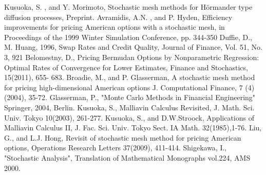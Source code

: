 \documentclass[12pt]{article}
\begin{document}
\begin{thebibliography}{99}

Kusuoka, S. , and Y. Morimoto, 
\newblock Stochastic mesh methods for H{\" o}rmander type diffusion processes, 
\newblock Preprint.
Avramidis, A.N. , and P. Hyden, 
\newblock Efficiency improvements for pricing American options 
with a stochastic mesh, 
\newblock in Proceedings of the 1999 Winter Simulation Conference, pp. 344-350
 Duffie, D., M. Huang, 1996,
\newblock  Swap Rates and Credit Quality, 
\newblock Journal of Finance, Vol. 51, No. 3, 921
 Belomestny, D., 
\newblock Pricing Bermudan Options by Nonparametric Regression: 
Optimal Rates of Convergence for Lower Estimates,
\newblock Finance and Stochastics, 15(2011), 655- 683.
 Broadie, M., and P. Glasserman,
\newblock A stochastic mesh method for pricing high-dimensional American options
\newblock J. Computational Finance, 7 (4) (2004), 35-72.
%
  Glasserman, P.,
\newblock "Monte Carlo Methods in Financial Engineering"
\newblock Springer,  2004, Berlin. 
Kusuoka, S.,
\newblock Malliavin Calculus Revisited,
\newblock  J. Math. Sci. Univ. Tokyo 10(2003), 261-277.
%
Kusuoka, S., and D.W.Stroock, 
\newblock Applications of Malliavin Calculus II,
\newblock J. Fac. Sci. Univ. Tokyo Sect. IA Math. 32(1985),1-76.
%
 Liu, G., and L.J. Hong,
\newblock Revisit of stochastic mesh method for pricing American options,
\newblock Operations Research Letters 37(2009), 411-414.
%
Shigekawa, I.,
\newblock "Stochastic Analysis",
\newblock Translation of Mathematical Monographs vol.224,
AMS 2000.
%
\end{thebibliography}
\end{document}
